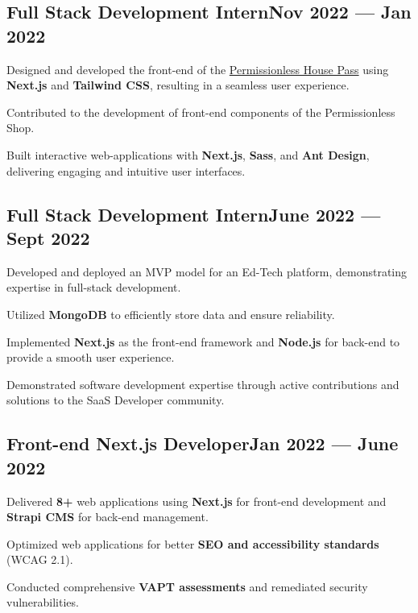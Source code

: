 \subsection{{Full Stack Development Intern\hfill Nov 2022 --- Jan 2022}}
\begin{zitemize}
\item Designed and developed the front-end of the \href{https://permissionless.house}{Permissionless House Pass} using \textbf{Next.js} and \textbf{Tailwind CSS}, resulting in a seamless user experience.
\item Contributed to the development of front-end components of the Permissionless Shop.
\item Built interactive web-applications with \textbf{Next.js}, \textbf{Sass}, and \textbf{Ant Design}, delivering engaging and intuitive user interfaces.
\end{zitemize}

\subsection{{Full Stack Development Intern\hfill June 2022 --- Sept 2022}}
\begin{zitemize}
\item Developed and deployed an MVP model for an Ed-Tech platform, demonstrating expertise in full-stack development.
\item Utilized \textbf{MongoDB} to efficiently store data and ensure reliability.
\item Implemented \textbf{Next.js} as the front-end framework and \textbf{Node.js} for back-end to provide a smooth user experience.
\item Demonstrated software development expertise through active contributions and solutions to the SaaS Developer community.
\end{zitemize}

\subsection{{Front-end Next.js Developer\hfill Jan 2022 --- June 2022}}
\begin{zitemize}
\item Delivered \textbf{8+} web applications using \textbf{Next.js} for front-end development and \textbf{Strapi CMS} for back-end management.
\item Optimized web applications for better \textbf{SEO and accessibility standards} (WCAG 2.1).
\item Conducted comprehensive \textbf{VAPT assessments} and remediated security vulnerabilities.
\end{zitemize}

